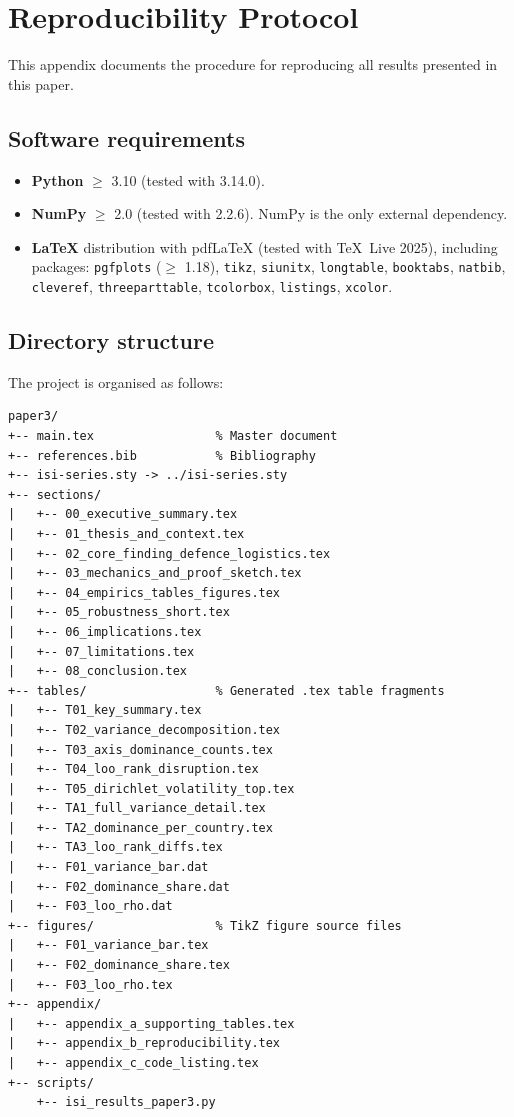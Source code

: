 \section{Reproducibility Protocol}\label{app:reproducibility}

This appendix documents the procedure for reproducing all results
presented in this paper.

\subsection{Software requirements}

\begin{itemize}[leftmargin=2em]
  \item \textbf{Python} $\geq$ 3.10 (tested with 3.14.0).
  \item \textbf{NumPy} $\geq$ 2.0 (tested with 2.2.6).
    NumPy is the only external dependency.
  \item \textbf{LaTeX} distribution with pdfLaTeX (tested with
    TeX~Live 2025), including packages: \texttt{pgfplots} ($\geq$
    1.18), \texttt{tikz}, \texttt{siunitx}, \texttt{longtable},
    \texttt{booktabs}, \texttt{natbib}, \texttt{cleveref},
    \texttt{threeparttable}, \texttt{tcolorbox}, \texttt{listings},
    \texttt{xcolor}.
\end{itemize}

\subsection{Directory structure}

The project is organised as follows:

\begin{verbatim}
paper3/
+-- main.tex                 % Master document
+-- references.bib           % Bibliography
+-- isi-series.sty -> ../isi-series.sty
+-- sections/
|   +-- 00_executive_summary.tex
|   +-- 01_thesis_and_context.tex
|   +-- 02_core_finding_defence_logistics.tex
|   +-- 03_mechanics_and_proof_sketch.tex
|   +-- 04_empirics_tables_figures.tex
|   +-- 05_robustness_short.tex
|   +-- 06_implications.tex
|   +-- 07_limitations.tex
|   +-- 08_conclusion.tex
+-- tables/                  % Generated .tex table fragments
|   +-- T01_key_summary.tex
|   +-- T02_variance_decomposition.tex
|   +-- T03_axis_dominance_counts.tex
|   +-- T04_loo_rank_disruption.tex
|   +-- T05_dirichlet_volatility_top.tex
|   +-- TA1_full_variance_detail.tex
|   +-- TA2_dominance_per_country.tex
|   +-- TA3_loo_rank_diffs.tex
|   +-- F01_variance_bar.dat
|   +-- F02_dominance_share.dat
|   +-- F03_loo_rho.dat
+-- figures/                 % TikZ figure source files
|   +-- F01_variance_bar.tex
|   +-- F02_dominance_share.tex
|   +-- F03_loo_rho.tex
+-- appendix/
|   +-- appendix_a_supporting_tables.tex
|   +-- appendix_b_reproducibility.tex
|   +-- appendix_c_code_listing.tex
+-- scripts/
    +-- isi_results_paper3.py
\end{verbatim}

